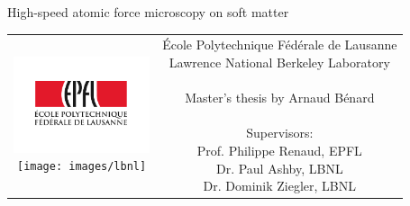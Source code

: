 \begin{titlepage}
\begin{center}
\sffamily


\null\vspace{2cm}
{\huge High-speed atomic force microscopy on soft matter}

    
\vfill

\begin{tabular} {cc}
\parbox{0.3\textwidth}{
	\includegraphics[width=4cm]{images/epfl}\\ 
	\texttt{[image: images/lbnl]}}
&
\parbox{0.7\textwidth}{
	École Polytechnique Fédérale de Lausanne\\
	Lawrence National Berkeley Laboratory\\ \\
	Master's thesis by Arnaud Bénard\\
	\\
	Supervisors:\\
	    Prof. Philippe Renaud, EPFL\\
	    Dr. Paul Ashby, LBNL\\
	    Dr. Dominik Ziegler, LBNL\\[12pt]
}
\end{tabular}

\end{center}
\vspace{2cm}
\end{titlepage}